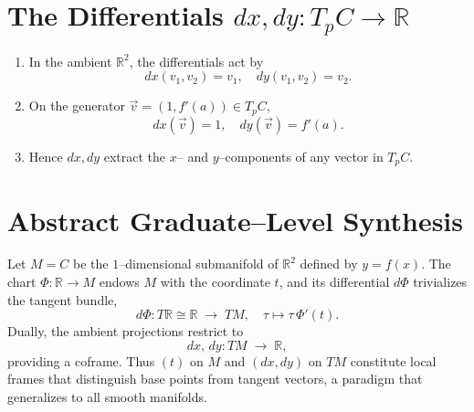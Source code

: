 \documentclass[12pt]{article}
\numberwithin{equation}{section}
\begin{document}
	\section{The Differentials \(dx,dy\colon T_pC\to\mathbb{R}\)}
	\begin{enumerate}
		\item In the ambient \(\mathbb{R}^2\), the differentials act by
		\[
		dx(v_1,v_2)=v_1,
		\quad
		dy(v_1,v_2)=v_2.
		\]
		\item On the generator \(\vec v=(1,f'(a))\in T_pC\),
		\[
		dx(\vec v)=1,
		\quad
		dy(\vec v)=f'(a).
		\]
		\item Hence \(dx,dy\) extract the \(x\)– and \(y\)–components of any vector in \(T_pC\).
	\end{enumerate}
	
	\section*{Abstract Graduate–Level Synthesis}
	Let \(M=C\) be the \(1\)--dimensional submanifold of \(\mathbb{R}^2\) defined by \(y=f(x)\).
	The chart \(\Phi\colon\mathbb{R}\to M\) endows \(M\) with the coordinate \(t\), and its
	differential \(d\Phi\) trivializes the tangent bundle,
	\[
	d\Phi\colon T\mathbb{R}\cong\mathbb{R}\;\longrightarrow\;TM,
	\quad
	\tau\mapsto \tau\,\Phi'(t).
	\]
	Dually, the ambient projections restrict to
	\[
	dx,\,dy\colon TM\;\longrightarrow\;\mathbb{R},
	\]
	providing a coframe.  Thus \((t)\) on \(M\) and \((dx,dy)\) on \(TM\) constitute
	local frames that distinguish base points from tangent vectors, a paradigm
	that generalizes to all smooth manifolds.
\end{document}
